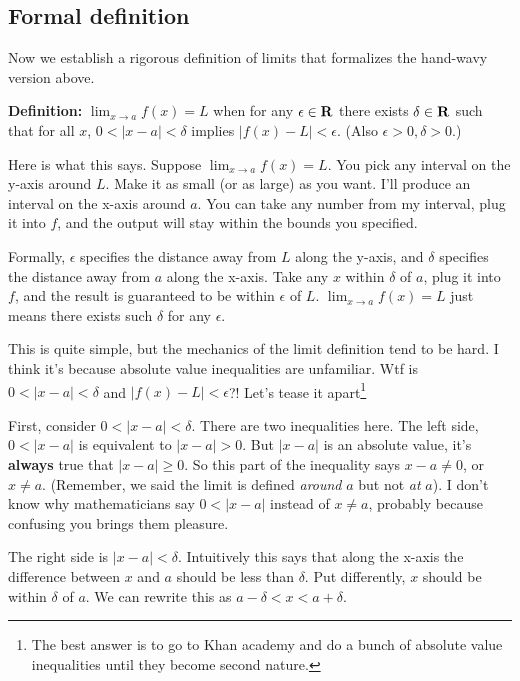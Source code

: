 \subsection{Formal definition}

Now we establish a rigorous definition of limits that formalizes the
hand-wavy version above.

\vs

\textbf{Definition:} $\lim_{x\to a}f(x)=L$ when for any
$\epsilon\in\mathbf{R}$ there exists $\delta\in\mathbf{R}$ such that for all $x$,
$0<|x-a|<\delta$ implies $|f(x)-L|<\epsilon$. (Also $\epsilon>0, \delta>0$.)

\vs

Here is what this says. Suppose $\lim_{x\to a}f(x)=L$. You pick any
interval on the y-axis around $L$. Make it as small (or as large) as
you want. I'll produce an interval on the x-axis around $a$. You can
take any number from my interval, plug it into $f$, and the output
will stay within the bounds you specified.

\vs

Formally, $\epsilon$ specifies the distance away from $L$ along the y-axis,
and $\delta$ specifies the distance away from $a$ along the x-axis. Take
any $x$ within $\delta$ of $a$, plug it into $f$, and the result is
guaranteed to be within $\epsilon$ of $L$. $\lim_{x\to a}f(x)=L$ just means
there exists such $\delta$ for any $\epsilon$.

\vs

This is quite simple, but the mechanics of the limit definition tend
to be hard. I think it's because absolute value inequalities are
unfamiliar. Wtf is $0<|x-a|<\delta$ and $|f(x)-L|<\epsilon$?! Let's tease it
apart\footnote{The best answer is to go to Khan academy and do a bunch
  of absolute value inequalities until they become second nature.}

\vs

First, consider $0<|x-a|<\delta$. There are two inequalities here. The left
side, $0<|x-a|$ is equivalent to $|x-a|>0$. But $|x-a|$ is an absolute
value, it's \textbf{always} true that $|x-a|\geq 0$. So this part of the
inequality says $x-a\neq 0$, or $x\neq a$. (Remember, we said the limit is
defined \textit{around} $a$ but not \textit{at} $a$). I don't know why
mathematicians say $0<|x-a|$ instead of $x\neq a$, probably because
confusing you brings them pleasure.

\vs

The right side is $|x-a|<\delta$. Intuitively this says that along the
x-axis the difference between $x$ and $a$ should be less than
$\delta$. Put differently, $x$ should be within $\delta$ of $a$. We can rewrite
this as $a-\delta<x<a+\delta$.

